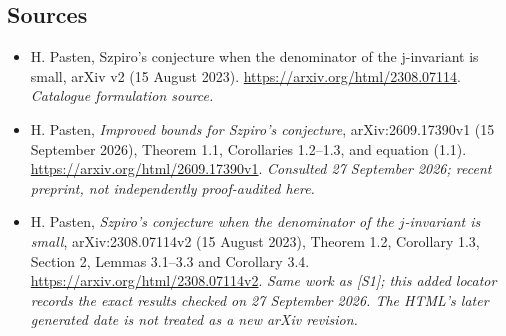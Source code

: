 \documentclass[11pt,a4paper]{article}
\numberwithin{equation}{section}
\begin{document}
\subsection{Sources}
\begin{itemize}\raggedright
\item[\textnormal{[S1]}]\hypertarget{source:105:1}{} H. Pasten, Szpiro's conjecture when the denominator of the j-invariant is small, arXiv v2 (15 August 2023).
\url{https://arxiv.org/html/2308.07114}.
{\small\textit{Catalogue formulation source.}}
\item[\textnormal{[E1]}]\hypertarget{extra:105:1}{} H. Pasten,
\emph{Improved bounds for Szpiro's conjecture}, arXiv:2609.17390v1
(15 September 2026), Theorem 1.1, Corollaries 1.2--1.3,
and equation (1.1).
\url{https://arxiv.org/html/2609.17390v1}.
{\small\textit{Consulted 27 September 2026; recent preprint, not independently proof-audited here.}}
\item[\textnormal{[E2]}]\hypertarget{extra:105:2}{} H. Pasten,
\emph{Szpiro's conjecture when the denominator of the $j$-invariant is small},
arXiv:2308.07114v2 (15 August 2023), Theorem 1.2, Corollary 1.3,
Section 2, Lemmas 3.1--3.3 and Corollary 3.4.
\url{https://arxiv.org/html/2308.07114v2}.
{\small\textit{Same work as [S1]; this added locator records the exact results checked on 27 September 2026. The HTML's later generated date is not treated as a new arXiv revision.}}
\end{itemize}
\end{document}
